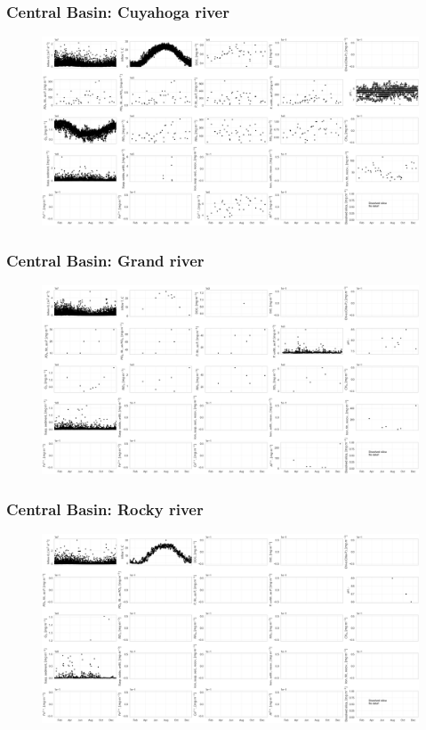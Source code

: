 \documentclass{beamer}
\begin{document}
\begin{frame}
\frametitle{Central Basin: Cuyahoga river}
\begin{figure}
\includegraphics[width=\textwidth]{rivers/Central basin/plot_1yr cuyahogariver.png}
\end{figure}
\end{frame}

\begin{frame}
\frametitle{Central Basin: Grand river}
\begin{figure}
\includegraphics[width=\textwidth]{rivers/Central basin/plot_1yr grandriver.png}
\end{figure}
\end{frame}

\begin{frame}
\frametitle{Central Basin: Rocky river}
\begin{figure}
\includegraphics[width=\textwidth]{rivers/Central basin/plot_1yr rockyriver.png}
\end{figure}
\end{frame}
\end{document}
